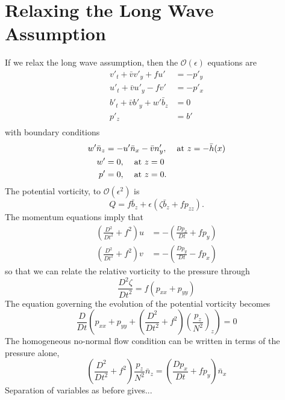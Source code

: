 \documentclass[12pt]{workjournal}
\begin{document}
\section{Relaxing the Long Wave Assumption}
If we relax the long wave assumption, then the $\mathcal{O}(\epsilon)$ equations are
   \begin{subequations}
   \begin{align}
   v'_t + \bar{v} v'_y + f u' &= -p'_y \\
   u'_t + \bar{v} u'_y - f v' &= -p'_x\\
   b'_t + \bar{v} b'_y  + w' \bar{b}_z &= 0 \\
   p'_z &= b' \\
   \end{align}\label{eq:OrderEpsilonShort}
   \end{subequations}   
  with boundary conditions
     \begin{subequations}
   \begin{align}
   w'\bar{n}_z &= -u' \bar{n}_x - \bar{v}n'_y, \hspace{4mm} \text{at } z=-\bar{h}(x) \\
   w' &= 0 , \hspace{4mm} \text{at } z=0 \\
   p' &= 0, \hspace{4mm} \text{at } z=0.
   \end{align}
   \end{subequations} 
The potential vorticity, to $\mathcal{O}(\epsilon^2)$ is
\begin{equation}
Q = f\bar{b}_z + \epsilon( \zeta \bar{b}_z + f p_{zz} ).
\end{equation}
The momentum equations imply that 
\begin{subequations}
\begin{align}
\left(\frac{D^2}{Dt^2} + f^2\right)u &= -( \frac{Dp_x}{Dt} + fp_y) \\
\left(\frac{D^2}{Dt^2} + f^2\right)v &= -( \frac{Dp_y}{Dt} - fp_x) 
\end{align}
\end{subequations}
so that we can relate the relative vorticity to the pressure through
\begin{equation}
\frac{D^2 \zeta}{Dt^2} = f (p_{xx} + p_{yy} )
\end{equation}
The equation governing the evolution of the potential vorticity becomes
\begin{equation}
\frac{D}{Dt}\left( p_{xx} + p_{yy} + \left(\frac{D^2}{Dt^2} + f^2 \right)\left(\frac{p_z}{N^2} \right)_z\right) =0
\end{equation}
The homogeneous no-normal flow condition can be written in terms of the pressure alone,
\begin{equation}
\left(\frac{D^2}{Dt^2} + f^2\right)\frac{p_z}{N^2}\bar{n}_z = ( \frac{Dp_x}{Dt} + fp_y) \bar{n}_x
\end{equation}
Separation of variables as before gives...
\pagebreak





\end{document}
